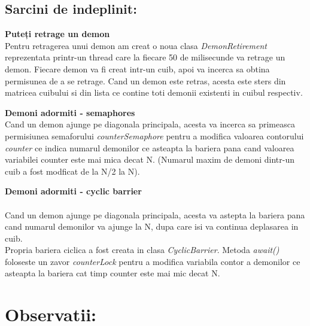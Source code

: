 \documentclass{article}
\begin{document}
        \subsection {Sarcini de indeplinit:}
        \item \textbf{Puteți retrage un demon}
        \\
        
        Pentru retragerea unui demon am creat o noua clasa \textit{DemonRetirement} reprezentata printr-un thread care la fiecare 50 de milisecunde va retrage un demon. Fiecare demon va fi creat intr-un cuib, apoi va incerca sa obtina permisunea de a se retrage. Cand un demon este retras, acesta este sters din matricea cuibului si din lista ce contine toti demonii existenti in cuibul respectiv.
     
        \item \textbf{Demoni adormiti - semaphores }\\
        
        
        Cand un demon ajunge pe diagonala principala, acesta va incerca sa primeasca permisiunea semaforului \textit{counterSemaphore} pentru a modifica valoarea contorului \textit{counter} ce indica numarul demonilor ce asteapta la bariera pana cand valoarea variabilei counter este mai mica decat N. (Numarul maxim de demoni dintr-un cuib a fost modficat de la N/2 la N).
        
        \item \textbf{Demoni adormiti - cyclic barrier}
        \\
        \\
        Cand un demon ajunge pe diagonala principala, acesta va astepta la bariera pana cand numarul demonilor va ajunge la N, dupa care isi va continua deplasarea in cuib.
        \\
        
        Propria bariera ciclica a fost creata in clasa \textit{CyclicBarrier}. Metoda \textit{await()} foloseste un zavor \textit{counterLock} pentru a modifica variabila contor a demonilor ce asteapta la bariera cat timp counter este mai mic decat N.
        

\section{\textbf{Observatii: }}
\end{document}
